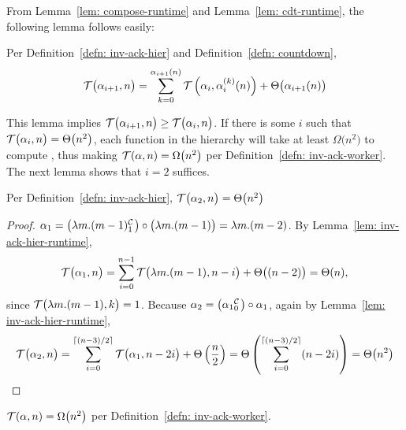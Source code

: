 From Lemma~\ref{lem: compose-runtime} and Lemma~\ref{lem: cdt-runtime}, the following lemma follows easily:
\begin{lem} \label{lem: inv-ack-hier-runtime}
	Per Definition~\ref{defn: inv-ack-hier} and Definition~\ref{defn: countdown},
	\begin{equation*}
	\mathcal{T}\big(\alpha_{i+1}, n\big) = \sum_{k=0}^{\alpha_{i+1}(n)}\mathcal{T}\left(\alpha_i, \alpha_i^{(k)}(n)\right) + \Theta\big(\alpha_{i+1}(n)\big)
	\end{equation*}
\end{lem}
This lemma implies $\mathcal{T}\big(\alpha_{i+1}, n\big) \ge \mathcal{T}\big(\alpha_i, n\big)$. If there is some $i$ such that $\mathcal{T}\big(\alpha_i, n\big) = \Theta\big(n^2\big)$, each function in the hierarchy will take at least $\Omega\big(n^2\big)$ to compute , thus making $\mathcal{T}(\alpha, n) = \Omega\big(n^2\big)$ per Definition~\ref{defn: inv-ack-worker}. The next lemma shows that $i = 2$ suffices.
\begin{lem}
	Per Definition~\ref{defn: inv-ack-hier}, $\mathcal{T}\big(\alpha_2, n\big) = \Theta\big(n^2\big)$
\end{lem}
\begin{proof}
	$\alpha_1 = \big(\cdt{\lambda m.(m-1)}{1}\big)\circ \big(\lambda m.(m-1)\big) = \lambda m.(m - 2)$. By Lemma~\ref{lem: inv-ack-hier-runtime},
	\begin{equation*}
	\mathcal{T}\big(\alpha_1, n\big) = \sum_{i=0}^{n-1} \mathcal{T}\big(\lambda m.(m-1), n - i\big) + \Theta\big((n-2)\big) = \Theta(n)\text{,}
	\end{equation*}
	since $\mathcal{T}\big(\lambda m.(m-1), k\big) = 1$. Because $\alpha_2 = \big(\cdt{\alpha_1}{0}\big)\circ \alpha_1 $, again by Lemma~\ref{lem: inv-ack-hier-runtime},
	\begin{equation*}
	\mathcal{T}\big(\alpha_2, n\big)
	= \sum_{i=0}^{\lceil (n-3)/2 \rceil} \mathcal{T} \big(\alpha_1, n-2i\big) + \Theta\left(\frac{n}{2}\right)
	= \Theta\left( \sum_{i=0}^{\lceil (n-3)/2 \rceil}(n - 2i) \right)
	= \Theta\big(n^2\big)
	\end{equation*}
\end{proof}
\begin{col}
	$\mathcal{T}(\alpha, n) = \Omega\big(n^2\big)$ per Definition~\ref{defn: inv-ack-worker}.
\end{col}

